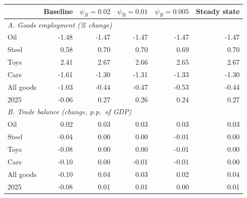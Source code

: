 \begin{tabular}{lrrrrr}
\toprule
 & Baseline & $\psi_B = 0.02$ & $\psi_B = 0.01$ & $\psi_B = 0.005$ & Steady state \\
\midrule
\multicolumn{6}{l}{\textit{A. Goods employment (\% change)}} \\
Oil & -1.48 & -1.47 & -1.47 & -1.47 & -1.47 \\
Steel & 0.58 & 0.70 & 0.70 & 0.69 & 0.70 \\
Toys & 2.41 & 2.67 & 2.66 & 2.65 & 2.67 \\
Cars & -1.61 & -1.30 & -1.31 & -1.33 & -1.30 \\
All goods & -1.03 & -0.44 & -0.47 & -0.53 & -0.44 \\
2025 & -0.06 & 0.27 & 0.26 & 0.24 & 0.27 \\
\midrule
\multicolumn{6}{l}{\textit{B. Trade balance (change, p.p.\ of GDP)}} \\
Oil & 0.02 & 0.03 & 0.03 & 0.03 & 0.03 \\
Steel & -0.04 & 0.00 & 0.00 & -0.01 & 0.00 \\
Toys & -0.08 & 0.00 & 0.00 & -0.01 & 0.00 \\
Cars & -0.10 & 0.00 & -0.01 & -0.01 & 0.00 \\
All goods & -0.10 & 0.04 & 0.03 & 0.02 & 0.04 \\
2025 & -0.08 & 0.01 & 0.01 & 0.00 & 0.01 \\
\bottomrule
\end{tabular}
